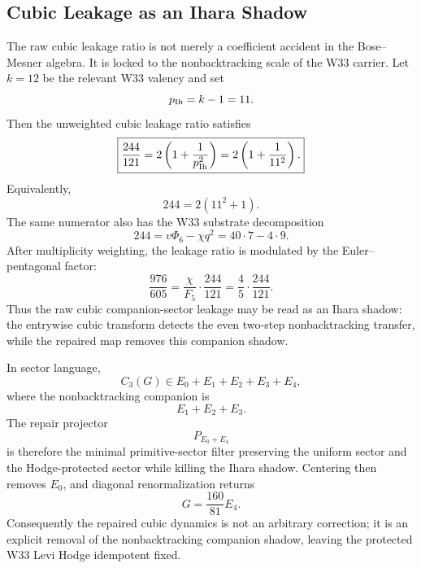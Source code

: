 
\subsection{Cubic Leakage as an Ihara Shadow}\label{subsec:cubic-leakage-ihara-shadow}

The raw cubic leakage ratio is not merely a coefficient accident in the
Bose--Mesner algebra.  It is locked to the nonbacktracking scale of the W33
carrier.  Let $k=12$ be the relevant W33 valency and set
\[
p_{\rm Ih}=k-1=11.
\]
Then the unweighted cubic leakage ratio satisfies
\[
\boxed{
\frac{244}{121}
=2\left(1+\frac{1}{p_{\rm Ih}^2}\right)
=2\left(1+\frac{1}{11^2}\right).
}
\]
Equivalently,
\[
244=2(11^2+1).
\]
The same numerator also has the W33 substrate decomposition
\[
\boxed{
244=v\Phi_6-\chi q^2=40\cdot7-4\cdot9.
}
\]
After multiplicity weighting, the leakage ratio is modulated by the
Euler--pentagonal factor:
\[
\boxed{
\frac{976}{605}=\frac{\chi}{F_5}\cdot\frac{244}{121}
=\frac45\cdot\frac{244}{121}.
}
\]
Thus the raw cubic companion-sector leakage may be read as an Ihara shadow: the
entrywise cubic transform detects the even two-step nonbacktracking transfer,
while the repaired map removes this companion shadow.

In sector language,
\[
C_3(G)\in E_0+E_1+E_2+E_3+E_4,
\]
where the nonbacktracking companion is
\[
E_1+E_2+E_3.
\]
The repair projector
\[
P_{E_0+E_4}
\]
is therefore the minimal primitive-sector filter preserving the uniform sector
and the Hodge-protected sector while killing the Ihara shadow.  Centering then
removes $E_0$, and diagonal renormalization returns
\[
G=\frac{160}{81}E_4.
\]
Consequently the repaired cubic dynamics is not an arbitrary correction; it is
an explicit removal of the nonbacktracking companion shadow, leaving the
protected W33 Levi Hodge idempotent fixed.
